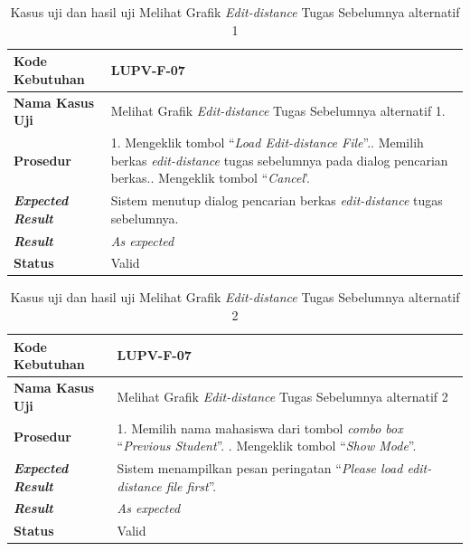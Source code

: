 \begin{longtable}{|L{3cm}|L{9cm}|}
  \caption{Kasus uji dan hasil uji Melihat Grafik \emph{Edit-distance}
  Tugas Sebelumnya alternatif 1}\label{tab:val-view-previous-ed-1} \\
  \hline
  \textbf{Kode Kebutuhan} & LUPV-F-07 \\\hline
  \textbf{Nama Kasus Uji} & Melihat Grafik \emph{Edit-distance} Tugas Sebelumnya alternatif 1.\\\hline
  \textbf{Prosedur} & 1. Mengeklik tombol ``\emph{Load Edit-distance File}''.. Memilih berkas \emph{edit-distance} tugas sebelumnya pada dialog pencarian
                      berkas.. Mengeklik tombol ``\emph{Cancel}'.\\\hline
  \textbf{\emph{Expected Result}} & Sistem menutup dialog pencarian berkas \emph{edit-distance}
                                    tugas sebelumnya.\\\hline
  \textbf{\emph{Result}} & \emph{As expected} \\\hline
  \textbf{Status} & Valid\\\hline
\end{longtable}

\begin{longtable}{|L{3cm}|L{9cm}|}
  \caption{Kasus uji dan hasil uji Melihat Grafik \emph{Edit-distance}
  Tugas Sebelumnya alternatif 2}\label{tab:val-view-previous-ed-2} \\
  \hline
  \textbf{Kode Kebutuhan} & LUPV-F-07 \\\hline
  \textbf{Nama Kasus Uji} & Melihat Grafik \emph{Edit-distance} Tugas Sebelumnya alternatif 2\\\hline
  \textbf{Prosedur} & 1. Memilih nama mahasiswa dari tombol \emph{combo box} ``\emph{Previous Student}''. . Mengeklik tombol ``\emph{Show Mode}''.\\\hline
  \textbf{\emph{Expected Result}} & Sistem menampilkan pesan peringatan ``\emph{Please load
                                    edit-distance file first}''.\\\hline
  \textbf{\emph{Result}} & \emph{As expected} \\\hline
  \textbf{Status} & Valid\\\hline
\end{longtable}

